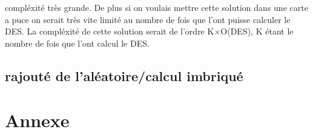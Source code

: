 \documentclass[a4paper]{report}
\begin{document}
compléxité très grande. 
				De plus si on voulais mettre cette solution dans une carte a puce on serait très vite limité au nombre de fois que l'ont puisse calculer le DES.
				La compléxité de cette solution serait de l'ordre K$\times$O(DES), K étant le nombre de fois que l'ont calcul le DES.
			
			\section{rajouté de l'aléatoire/calcul imbriqué}
		
		\chapter{Annexe}


		
\end{document}

